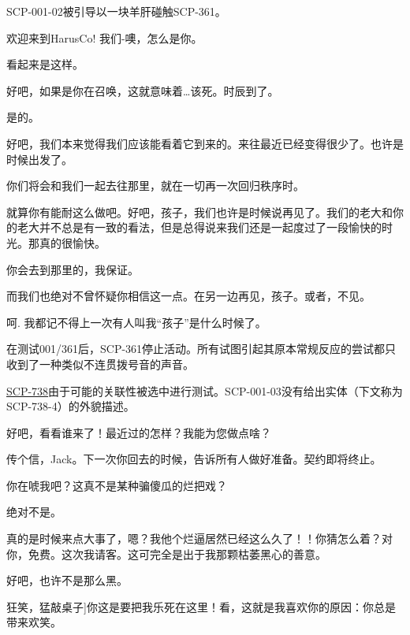 \begin{scpbox}


SCP-001-02被引导以一块羊肝碰触SCP-361。

欢迎来到HarusCo! 我们-噢，怎么是你。

看起来是这样。

好吧，如果是你在召唤，这就意味着…该死。时辰到了。

是的。

好吧，我们本来觉得我们应该能看着它到来的。来往最近已经变得很少了。也许是时候出发了。

你们将会和我们一起去往那里，就在一切再一次回归秩序时。

就算你有能耐这么做吧。好吧，孩子，我们也许是时候说再见了。我们的老大和你的老大并不总是有一致的看法，但是总得说来我们还是一起度过了一段愉快的时光。那真的很愉快。

你会去到那里的，我保证。

而我们也绝对不曾怀疑你相信这一点。在另一边再见，孩子。或者，不见。

呵. 我都记不得上一次有人叫我“孩子”是什么时候了。


\end{scpbox}

在测试001\slash 361后，SCP-361停止活动。所有试图引起其原本常规反应的尝试都只收到了一种类似不连贯拨号音的声音。


\hyperref[chap:SCP-738]{SCP-738}由于可能的关联性被选中进行测试。SCP-001-03没有给出实体（下文称为SCP-738-4）的外貌描述。

\begin{scpbox}


好吧，看看谁来了！最近过的怎样？我能为您做点啥？

传个信，Jack。下一次你回去的时候，告诉所有人做好准备。契约即将终止。

你在唬我吧？这真不是某种骗傻瓜的烂把戏？

绝对不是。

真的是时候来点大事了，嗯？我他个烂逼居然已经这么久了！！你猜怎么着？对你，免费。这次我请客。这可完全是出于我那颗枯萎黑心的善意。

好吧，也许不是那么黑。

\bb{SCP-738-4：}{[}狂笑，猛敲桌子]你这是要把我乐死在这里！看，这就是我喜欢你的原因：你总是带来欢笑。


\end{scpbox}

